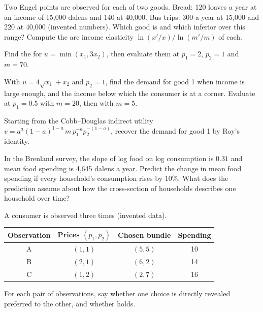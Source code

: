 \begin{exercise}[$\star$]\label{exo:b1:consumer-choice:normal}
Two Engel points are observed for each of two goods. Bread: 120 loaves a
year at an income of 15,000 dalens and 140 at 40,000. Bus trips: 300 a year
at 15,000 and 220 at 40,000 (invented numbers). Which good is  and
which inferior over this range? Compute the arc income elasticity
$\ln(x'/x)/\ln(m'/m)$ of each.
\end{exercise}

\begin{exercise}[$\star\star$]\label{exo:b1:consumer-choice:min}
Find the  for $u = \min(x_1, 3x_2)$, then evaluate them at
$p_1 = 2$, $p_2 = 1$ and $m = 70$.
\end{exercise}

\begin{exercise}[$\star\star$]\label{exo:b1:consumer-choice:quasi}
With $u = 4\sqrt{x_1} + x_2$ and $p_2 = 1$, find the demand for good 1 when
income is large enough, and the income below which the consumer is at a
corner. Evaluate at $p_1 = 0.5$ with $m = 20$, then with $m = 5$.
\end{exercise}

\begin{exercise}[$\star\star$]\label{exo:b1:consumer-choice:roy}
Starting from the Cobb--Douglas indirect utility
$v = a^a(1 - a)^{1-a}\,m\,p_1^{-a}p_2^{-(1-a)}$, recover the demand for good 1
by Roy's identity.
\end{exercise}

\begin{exercise}[$\star\star$]\label{exo:b1:consumer-choice:predict}
In the Brenland survey, the slope of log food on log consumption is $0.31$
and mean food spending is 4,645 dalens a year. %
Predict the change in mean food spending if every household's consumption
rises by $10\%$. What does the prediction assume about how the
cross-section of households describes one household over time?
\end{exercise}

\begin{exercise}[$\star\star$]\label{exo:b1:consumer-choice:warp-table}
A consumer is observed three times (invented data).
\begin{center}
\begin{tabular}{cccc}
\toprule
Observation & Prices $(p_1, p_2)$ & Chosen bundle & Spending\\
\midrule
A & $(1, 1)$ & $(5, 5)$ & 10\\
B & $(2, 1)$ & $(6, 2)$ & 14\\
C & $(1, 2)$ & $(2, 7)$ & 16\\
\bottomrule
\end{tabular}
\end{center}
For each pair of observations, say whether one choice is directly revealed
preferred to the other, and whether  holds.
\end{exercise}

